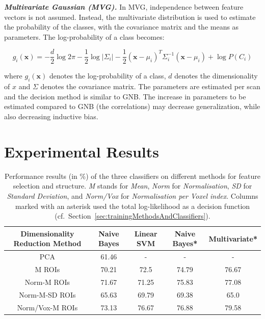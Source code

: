 \documentclass[preprint,journal,11pt]{vgtc}
\begin{document}
\textbf{\emph{Multivariate Gaussian (MVG).}} In MVG, independence between feature vectors is not assumed. Instead, the multivariate distribution is used to estimate the probability of the classes, with the covariance matrix and the means as parameters. The log-probability of a class becomes:

\begin{dmath}
\label{eq:multivariate}
g_{i}(\mathbf{x}) = -\frac{d}{2}\log{2\pi}-\frac{1}{2}\log{|\Sigma_{i}|}-\frac{1}{2}(\mathbf{x}-\mu_{i})^{T}\Sigma_{i}^{-1}(\textbf{x}-\mu_{i})+\log{P(C_{i})}
\end{dmath}

where $g_{i}(\mathbf{x})$ denotes the log-probability of a class, $d$ denotes the dimensionality of $x$ and $\Sigma$ denotes the covariance matrix. The parameters are estimated per scan and the decision method is similar to GNB. The increase in parameters to be estimated compared to GNB (the correlations) may decrease generalization, while also decreasing inductive bias.

\section{Experimental Results}
\label{sec:results}

\begin{table}[htpb]
\centering
{\small
\begin{tabular}{|c|c|c|c|c|}
\hline
\textbf{Dimensionality Reduction Method} & \textbf{Naive Bayes} & \textbf{Linear SVM} & \textbf{Naive Bayes*} & \textbf{Multivariate*} \\ \hline
PCA & 61.46 &  - & - & - \\
M ROIs & 70.21 & 72.5 & 74.79 & 76.67 \\
Norm-M ROIs & 71.67 & 71.25 & 75.83 & 77.08 \\
Norm-M-SD ROIs & 65.63 & 69.79 & 69.38 & 65.0 \\
Norm/Vox-M ROIs & 73.13 & 76.67 & 76.88 & 79.58 \\
\hline
\end{tabular}}
\caption{Performance results (in \%) of the three classifiers on different methods for feature selection and structure. \emph{M} stands for \emph{Mean}, \emph{Norm} for \emph{Normalisation}, \emph{SD} for \emph{Standard Deviation}, and \emph{Norm/Vox} for \emph{Normalisation per Voxel index}. Columns marked with an asterisk used the total log-likelihood as a decision function (cf.~Section~\ref{sec:trainingMethodsAndClassifiers}).}
\label{tab:results}
\end{table}
\end{document}
